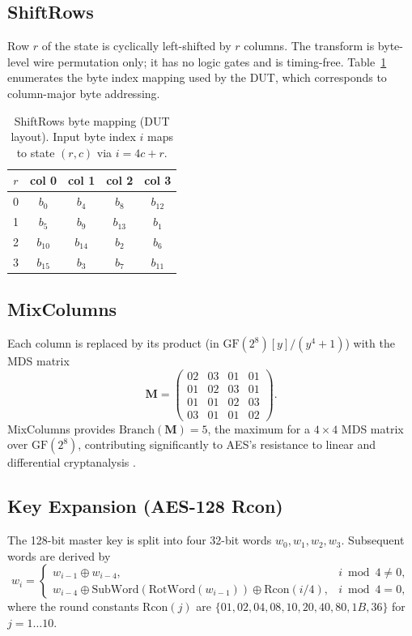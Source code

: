 \documentclass[conference,10pt,a4paper]{IEEEtran}
\begin{document}
\subsection{ShiftRows}
Row $r$ of the state is cyclically left-shifted by $r$ columns.
The transform is byte-level wire permutation only; it has no logic gates
and is timing-free.  Table~\ref{tab:shiftrows} enumerates the byte index
mapping used by the DUT, which corresponds to column-major byte
addressing.

\begin{table}[t]
\caption{ShiftRows byte mapping (DUT layout). Input byte index $i$ maps
to state $(r,c)$ via $i=4c+r$.}
\label{tab:shiftrows}
\centering
\begin{tabular}{c|cccc}
\toprule
$r$ & col 0 & col 1 & col 2 & col 3 \\
\midrule
0 & $b_{0}$  & $b_{4}$  & $b_{8}$  & $b_{12}$ \\
1 & $b_{5}$  & $b_{9}$  & $b_{13}$ & $b_{1}$  \\
2 & $b_{10}$ & $b_{14}$ & $b_{2}$  & $b_{6}$  \\
3 & $b_{15}$ & $b_{3}$  & $b_{7}$  & $b_{11}$ \\
\bottomrule
\end{tabular}
\end{table}

\subsection{MixColumns}
Each column is replaced by its product (in $\mathrm{GF}(2^8)[y]/(y^4+1)$)
with the MDS matrix
\[
\mathbf{M} = \begin{pmatrix}
02 & 03 & 01 & 01 \\
01 & 02 & 03 & 01 \\
01 & 01 & 02 & 03 \\
03 & 01 & 01 & 02
\end{pmatrix}.
\]
MixColumns provides $\mathrm{Branch}(\mathbf{M}) = 5$, the maximum for
a $4\times 4$ MDS matrix over $\mathrm{GF}(2^8)$, contributing
significantly to AES's resistance to linear and differential cryptanalysis
\cite[\S9]{daemenrijmen}.

\subsection{Key Expansion (AES-128 Rcon)}
The 128-bit master key is split into four 32-bit words
$w_0,w_1,w_2,w_3$.  Subsequent words are derived by
\[
 w_i = \begin{cases}
   w_{i-1}\oplus w_{i-4}, & i \bmod 4 \ne 0, \\
   w_{i-4} \oplus
   \mathrm{SubWord}(\mathrm{RotWord}(w_{i-1}))
   \oplus \mathrm{Rcon}(i/4), & i \bmod 4 = 0,
 \end{cases}
\]
where the round constants $\mathrm{Rcon}(j)$ are
$\{01,02,04,08,10,20,40,80,1B,36\}$ for $j=1\ldots 10$.
\end{document}
